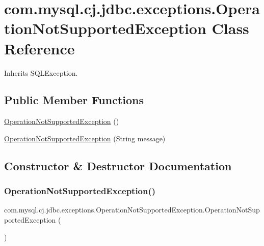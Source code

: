 \hypertarget{classcom_1_1mysql_1_1cj_1_1jdbc_1_1exceptions_1_1_operation_not_supported_exception}{}\section{com.\+mysql.\+cj.\+jdbc.\+exceptions.\+Operation\+Not\+Supported\+Exception Class Reference}
\label{classcom_1_1mysql_1_1cj_1_1jdbc_1_1exceptions_1_1_operation_not_supported_exception}


Inherits S\+Q\+L\+Exception.

\subsection*{Public Member Functions}
\begin{DoxyCompactItemize}
\item 
\mbox{\hyperlink{classcom_1_1mysql_1_1cj_1_1jdbc_1_1exceptions_1_1_operation_not_supported_exception_adc6587e2aa33596bd4996556063e3da4}{Operation\+Not\+Supported\+Exception}} ()
\item 
\mbox{\hyperlink{classcom_1_1mysql_1_1cj_1_1jdbc_1_1exceptions_1_1_operation_not_supported_exception_af652fea5842cc87244697e774eb64197}{Operation\+Not\+Supported\+Exception}} (String message)
\end{DoxyCompactItemize}


\subsection{Constructor \& Destructor Documentation}
\mbox{\label{classcom_1_1mysql_1_1cj_1_1jdbc_1_1exceptions_1_1_operation_not_supported_exception_adc6587e2aa33596bd4996556063e3da4}} 
\subsubsection{\texorpdfstring{Operation\+Not\+Supported\+Exception()}{OperationNotSupportedException()}\hspace{0.1cm}{\footnotesize\ttfamily [1/2]}}
{\footnotesize\ttfamily com.\+mysql.\+cj.\+jdbc.\+exceptions.\+Operation\+Not\+Supported\+Exception.\+Operation\+Not\+Supported\+Exception (\begin{DoxyParamCaption}{ }\end{DoxyParamCaption})}

